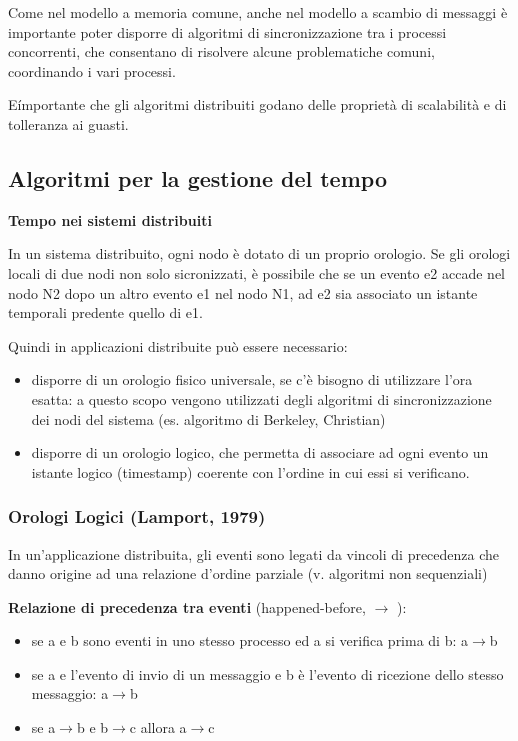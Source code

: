 \documentclass{article}
\begin{document}
\vspace{3mm}
Come nel modello a memoria comune, anche nel modello a scambio di messaggi è importante poter disporre di algoritmi di sincronizzazione tra i processi concorrenti, che consentano
di risolvere alcune problematiche comuni, coordinando i vari processi.

E\' importante che gli algoritmi distribuiti godano delle proprietà di scalabilità e di tolleranza ai guasti.

\subsection{Algoritmi per la gestione del tempo}

\vspace{3mm}
\textbf{Tempo nei sistemi distribuiti}

\vspace{3mm}
In un sistema distribuito, ogni nodo è dotato di un proprio orologio. Se gli orologi locali di due nodi non solo sicronizzati, è possibile che se un evento e2 accade nel nodo N2
dopo un altro evento e1 nel nodo N1, ad e2 sia associato un istante temporali predente quello di e1.

\vspace{3mm}
Quindi in applicazioni distribuite può essere necessario:
\begin{itemize}
    \item disporre di un orologio fisico universale, se c'è bisogno di utilizzare l'ora esatta: a questo scopo vengono utilizzati degli algoritmi di sincronizzazione dei nodi del sistema (es. algoritmo di Berkeley, Christian)
    \item disporre di un orologio logico, che permetta di associare ad ogni evento un istante logico (timestamp) coerente con l'ordine in cui essi si verificano.
\end{itemize}

\subsubsection{Orologi Logici (Lamport, 1979)}

In un'applicazione distribuita, gli eventi sono legati da vincoli di precedenza che danno origine ad una relazione d'ordine parziale (v. algoritmi non sequenziali)

\vspace{3mm}
\textbf{Relazione di precedenza tra eventi} (happened-before,  $\rightarrow$ ):
\begin{itemize}
    \item se a e b sono eventi in uno stesso processo ed a si verifica prima di b: a$\rightarrow$b
    \item se a e l'evento di invio di un messaggio e b è l'evento di ricezione dello stesso messaggio: a$\rightarrow$b
    \item se a$\rightarrow$b e b$\rightarrow$c allora a$\rightarrow$c
\end{itemize}
\end{document}
